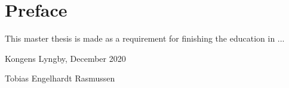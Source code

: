 \section{Preface}

\noindent This master thesis is made as a requirement for finishing the education in ...

\vspace{4cm}
\begin{flushright}
Kongens Lyngby, December 2020 \\
\vspace{2cm}

Tobias Engelhardt Rasmussen 

\end{flushright}
